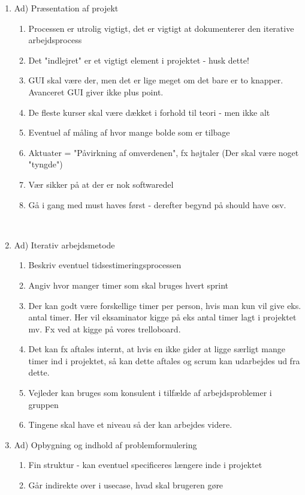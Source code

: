 \documentclass[12pt]{article}
\begin{document}
\begin{enumerate}
    \item Ad) Præsentation af projekt
    \begin{enumerate}
        \item Processen er utrolig vigtigt, det er vigtigt at dokumenterer den iterative arbejdsprocess 
        \item Det "indlejret" er et vigtigt element i projektet - husk dette!
        \item GUI skal være der, men det er lige meget om det bare er to knapper. Avanceret GUI giver ikke plus point.
        \item De fleste kurser skal være dækket i forhold til teori - men ikke alt 
        \item Eventuel af måling af hvor mange bolde som er tilbage 
        \item Aktuater = "Påvirkning af omverdenen", fx højtaler (Der skal være noget "tyngde") 
        \item Vær sikker på at der er nok softwaredel 
        \item Gå i gang med must haves først - derefter begynd på should have osv.
    \end{enumerate}
    \\
    \item Ad) Iterativ arbejdsmetode
    \begin{enumerate}
        \item Beskriv eventuel tidsestimeringsprocessen
        \item Angiv hvor manger timer som skal bruges hvert sprint  
        \item Der kan godt være forskellige timer per person, hvis man kun vil give eks. antal timer. Her vil eksaminator kigge på eks antal timer lagt i projektet mv. Fx ved at kigge på vores trelloboard. 
        \item Det kan fx aftales internt, at hvis en ikke gider at ligge særligt mange timer ind i projektet, så kan dette aftales og scrum kan udarbejdes ud fra dette. 
        \item Vejleder kan bruges som konsulent i tilfælde af arbejdsproblemer i gruppen
        \item Tingene skal have et niveau så der kan arbejdes videre. 
    \end{enumerate}
    
    \item Ad) Opbygning og indhold af problemformulering
    \begin{enumerate}
        \item Fin struktur - kan eventuel specificeres længere inde i projektet 
        \item Går indirekte over i usecase, hvad skal brugeren gøre 
    \end{enumerate}
    

\end{enumerate}
\end{document}
